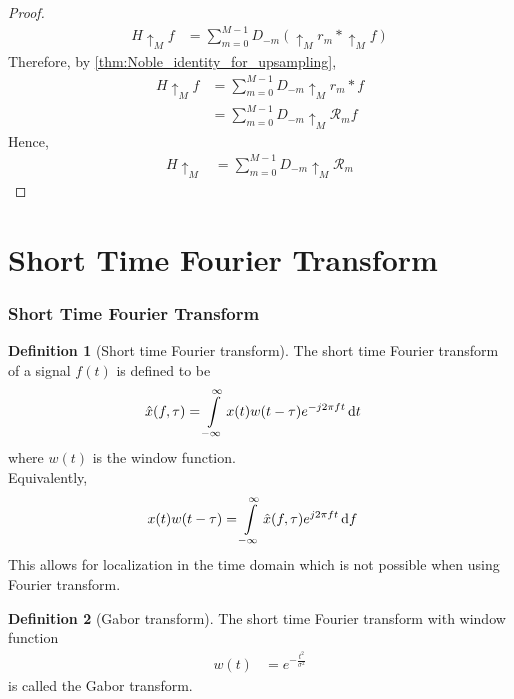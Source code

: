 \documentclass[titlepage, fleqn, a4paper, 12pt, twoside]{article}
\theoremstyle{definition}
\newtheorem{definition}{Definition}
\theoremstyle{theorem}
\def\upsample#1{\uparrow_{#1}}
\begin{document}
\begin{proof}
	\begin{align*}
		H \upsample{M} f &= \sum\limits_{m = 0}^{M - 1} D_{-m} \left( \upsample{M} r_m \ast \upsample{M} f \right)
	\end{align*}
	Therefore, by \cref{thm:Noble_identity_for_upsampling},
	\begin{align*}
		H \upsample{M} f &= \sum\limits_{m = 0}^{M - 1} D_{-m} \upsample{M} r_m \ast f\\
		&= \sum\limits_{m = 0}^{M - 1} D_{-m} \upsample{M} \mathcal{R}_m f
	\end{align*}
	Hence,
	\begin{align*}
		H \upsample{M} &= \sum\limits_{m = 0}^{M - 1} D_{-m} \upsample{M} \mathcal{R}_m
	\end{align*}
\end{proof}

\clearpage
\part{Short Time Fourier Transform}

\section{Short Time Fourier Transform}

\begin{definition}[Short time Fourier transform]
	The short time Fourier transform of a signal $f(t)$ is defined to be
	\begin{align*}
		\hat{x}(f,\tau) &= \int\limits_{-\infty}^{\infty} x(t) w(t - \tau) e^{-j 2 \pi f t} \dif t
	\end{align*}
	where $w(t)$ is the window function.\\
	Equivalently,
	\begin{align*}
		x(t) w(t - \tau) &= \int\limits_{-\infty}^{\infty} \hat{x}(f,\tau) e^{j 2 \pi f t} \dif f
	\end{align*}
	This allows for localization in the time domain which is not possible when using Fourier transform.
\end{definition}

\begin{definition}[Gabor transform]
	The short time Fourier transform with window function
	\begin{align*}
		w(t) &= e^{-\frac{t^2}{\sigma^2}}
	\end{align*}
	is called the Gabor transform.
\end{definition}
\end{document}
